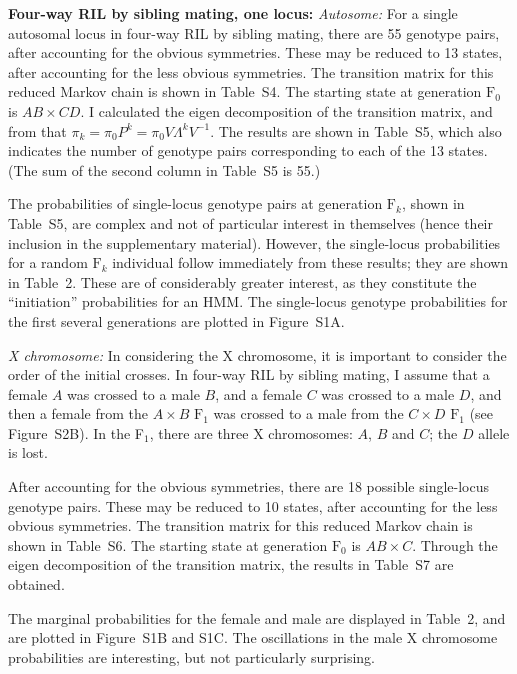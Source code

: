\documentclass[12pt,letterpaper]{article}
\begin{document}
\textbf{Four-way RIL by sibling mating, one locus:} \emph{Autosome:}
For a single autosomal locus in four-way RIL by sibling mating, there
are 55 genotype pairs, after accounting for the obvious symmetries.
These may be reduced to 13 states, after accounting for the less
obvious symmetries.  The transition matrix for this reduced Markov
chain is shown in Table~S4.  The starting state at generation
$\text{F}_0$ is $AB \times CD$.  I calculated the eigen decomposition
of the transition matrix, and from that $\pi_k = \pi_0 P^k = \pi_0 V
\Lambda^k V^{-1}$.  The results are shown in Table~S5, which also
indicates the number of genotype pairs corresponding to each of the 13
states.  (The sum of the second column in Table~S5 is 55.)

The probabilities of single-locus genotype pairs at generation $\text{F}_{k}$,
shown in Table~S5, are complex and not of particular interest in
themselves (hence their inclusion in the supplementary
material). However, the
single-locus probabilities for a random $\text{F}_k$ individual follow
immediately from these results; they 
are shown in Table~2.  These are of considerably greater interest, as
they constitute the ``initiation'' probabilities for an HMM.
The single-locus genotype probabilities for the first several
generations are plotted in Figure~S1A.





\emph{X chromosome:} 
In considering the X chromosome, it is important to consider the order
of the initial crosses.  In four-way RIL by sibling mating, I assume
that a female $A$ was crossed to a male $B$, and a female $C$ was
crossed to a male $D$, and then a female from the $A \times B$
$\text{F}_1$ was crossed to a male from the  $C \times D$ $\text{F}_1$
(see Figure~S2B).  In the F$_1$, there are three X chromosomes: $A$,
$B$ and $C$; the $D$ allele is lost.  

After accounting for the obvious symmetries, there are 18 possible
single-locus genotype pairs. 
These may be reduced to 10 states, after
accounting for the less obvious symmetries.  The transition matrix for
this reduced Markov chain is shown in Table~S6.  The starting state at
generation $\text{F}_0$ is $AB \times C$.  Through the eigen
decomposition of the transition matrix, the results in
Table~S7 are obtained.  

The marginal probabilities for the female and male are displayed in
Table~2, and are plotted in Figure~S1B and S1C.  The oscillations in
the male X chromosome probabilities are interesting, but not
particularly surprising.
\end{document}
